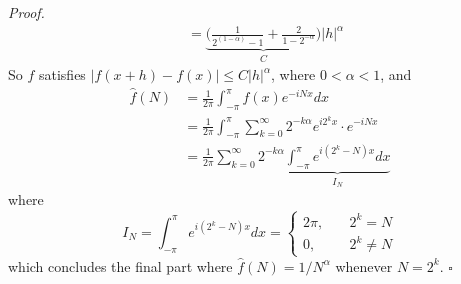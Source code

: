 \documentclass[12pt]{article}
\newenvironment{proof}{\textit{Proof.}}{\hfill$\square$}
\begin{document}
\begin{proof}
\begin{align*}
        &=\underbrace{\Big(\frac{1}{2^{(1-\alpha)}-1}+\frac{2}{1-2^{-\alpha}}\Big)}_{C}|h|^\alpha
    \end{align*}
    So $f$ satisfies $|f(x+h)-f(x)|\le C|h|^\alpha$, where $0<\alpha<1$, and
    \begin{align*}
        \hat{f}(N)&=\frac{1}{2\pi}\int_{-\pi}^{\pi}f(x)e^{-iNx}dx\\
        &=\frac{1}{2\pi}\int_{-\pi}^{\pi}\sum_{k=0}^{\infty}2^{-k\alpha}e^{i2^kx}\cdot e^{-iNx}\\
        &=\frac{1}{2\pi}\sum_{k=0}^{\infty}2^{-k\alpha}\underbrace{\int_{-\pi}^{\pi}e^{i(2^k-N)x}dx}_{I_N}
    \end{align*}
    where 
    \begin{equation*}
        I_N=\int_{-\pi}^{\pi}e^{i(2^k-N)x}dx=\begin{cases}
            2\pi,&\hspace{1em}2^k=N\\
            0,&\hspace{1em}2^k\ne N
        \end{cases}
    \end{equation*}
    which concludes the final part where $\hat{f}(N)=1/N^\alpha$ whenever $N=2^k$.
\end{proof}
\end{document}
